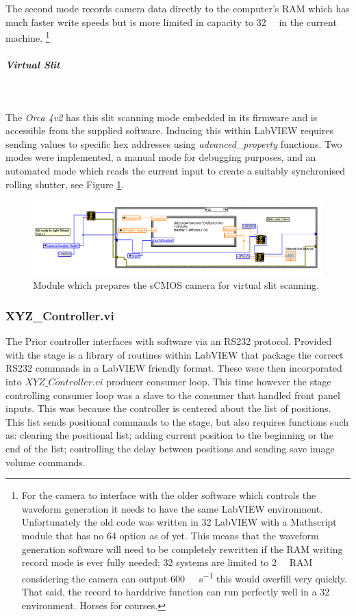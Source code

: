 The second mode records camera data directly to the computer's RAM which has much faster write speeds but is more limited in capacity to \SI{32}{\giga\byte}
in the current machine.
\footnote{For the camera to interface with the older software which controls the waveform generation it needs to have the same LabVIEW environment.
Unfortunately the old code was written in \SI{32}{\bit}
LabVIEW with a Mathscript module that has no \SI{64}{\bit}
 option as of yet.
This means that the waveform generation software will need to be completely rewritten if the RAM writing record mode is ever fully needed; \SI{32}{\bit}
systems are limited to \SI{2}{\giga\byte}
RAM considering the camera can output \SI{600}{\mega\byte\per\second}
this would overfill very quickly.
That said, the record to harddrive function can run perfectly well in a \SI{32}{\bit}
environment.
Horses for courses.}


\subparagraph{Virtual Slit}~

The \textit{Orca 4v2} has this slit scanning mode embedded in its firmware and is accessible from the supplied software.
Inducing this within LabVIEW requires sending values to specific hex addresses using \textit{advanced\_property} functions.
Two modes were implemented, a manual mode for debugging purposes, and an automated mode which reads the current input to create a suitably synchronised rolling shutter, see Figure \ref{fig:camera_virtual_slit_module}.

\begin{figure}
\centering
\includegraphics[width=0.7\linewidth]{Figures/camera_virtual_slit_module}
\caption[LabVIEW virtual slit scanning module]{Module which prepares the sCMOS camera for virtual slit scanning.}
\label{fig:camera_virtual_slit_module}
\end{figure}

\subsubsection{XYZ\_Controller.vi}

The Prior controller interfaces with software via an RS232 protocol.
Provided with the stage is a library of routines within LabVIEW that package the correct RS232 commands in a LabVIEW friendly format.
These were then incorporated into $XYZ\_Controller.vi$ producer consumer loop.
This time however the stage controlling consumer loop was a slave to the consumer that handled front panel inputs.
This was because the controller is centered about the list of positions.
This list sends positional commands to the stage, but also requires functions such as: clearing the positional list; adding current position to the beginning or the end of the list; controlling the delay between positions and sending save image volume commands.

